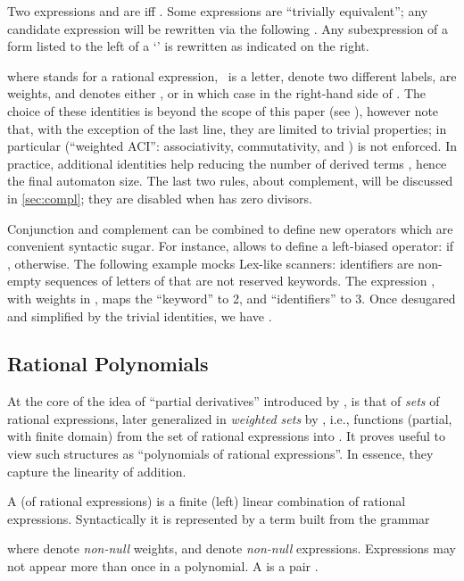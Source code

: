 \documentclass[a4paper,USenglish]{lipics}
\begin{document}
Two expressions  and  are  iff
.  Some expressions are ``trivially equivalent''; any
candidate expression will be rewritten via the following .  Any subexpression of a form listed to the left of a
`' is rewritten as indicated on the right.

where  stands for a rational expression, ~is a letter,
 denote two different labels, 
are weights, and  denotes either , or
 in which case  in the right-hand side of .
The choice of these identities is beyond the scope of this paper (see
\cite{sakarovitch.09.eat}), however note that, with the exception of the
last line, they are limited to trivial properties; in particular
 (``weighted ACI'': associativity, commutativity, and
) is not
enforced.  In practice, additional identities help reducing the number of
derived terms \citep{owens.2009.jfp}, hence the final automaton size.  The
last two rules, about complement, will be discussed in \cref{sec:compl};
they are disabled when  has zero divisors.

\begin{Example}
  \label{ex:ab}
  Conjunction and complement can be combined to define new operators which
  are convenient syntactic sugar.  For instance,
   allows to define a
  left-biased  operator:  if
  ,  otherwise.  The following example
  mocks Lex-like scanners: identifiers are non-empty sequences of letters of
   that are not reserved keywords.  The expression
  , with weights in
  , maps the ``keyword''  to 2, and ``identifiers'' to 3.
  Once desugared and simplified by the trivial identities, we have
  .
\end{Example}


\subsection{Rational Polynomials}
\label{sec:poly}

At the core of the idea of ``partial derivatives'' introduced by
\citet{antimirov.1996.tcs}, is that of \emph{sets} of rational expressions,
later generalized in \emph{weighted sets} by \citet{lombardy.2005.tcs},
i.e., functions (partial, with finite domain) from the set of rational
expressions into .  It proves useful to view such
structures as ``polynomials of rational expressions''.  In essence, they
capture the linearity of addition.

\begin{Definition}
  A  (of rational expressions) is a finite (left) linear
  combination of rational expressions.  Syntactically it is represented by a
  term built from the grammar
  
  where  denote \emph{non-null} weights, and
   denote \emph{non-null} expressions.  Expressions may not appear
  more than once in a polynomial.  A  is a pair
  .
\end{Definition}
\end{document}
